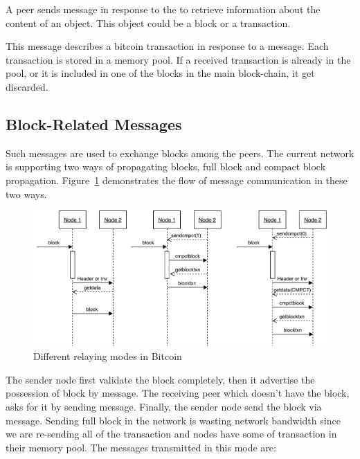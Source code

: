  A peer sends  message in response to the  to retrieve information about the content of an object. This object could be a block or a transaction. 

 This message describes a bitcoin transaction in response to a  message. Each transaction is stored in a memory pool. If a received transaction is already in the pool, or it is included in one of the blocks in the main block-chain, it get discarded. 


\subsection{Block-Related Messages} Such messages are used to exchange \bc blocks among the peers. 
The current \bc network is supporting two ways of propagating blocks, full block and compact block
propagation. Figure~\ref{fig:protocol-flow} demonstrates the flow of message communication in these
two ways.


  \begin{figure}[h]
\centering
\includegraphics[scale=0.35]{image/btc-protocol-flow.pdf}
\caption{Different relaying modes in  Bitcoin}
\label{fig:protocol-flow}
\end{figure}


 The sender node first validate the block completely, then it advertise the possession of block by  message. The receiving peer which doesn't have the block, asks for it by sending  message. Finally, the sender node send the block via  message. Sending full block in the network is wasting network bandwidth since we are re-sending all of the transaction and nodes have some of transaction in their memory pool. The messages transmitted in this mode are: 

